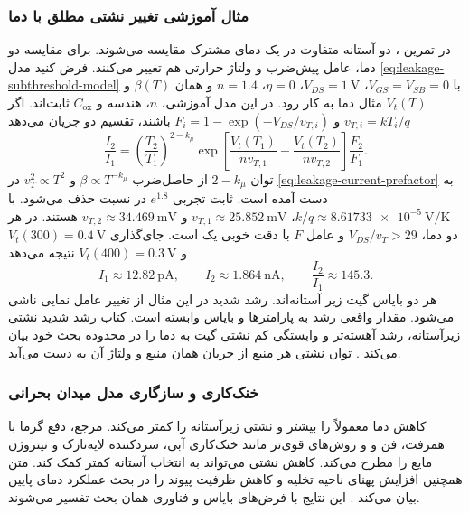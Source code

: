 \subsubsection*{مثال آموزشی تغییر نشتی مطلق با دما}
در تمرین ، دو آستانه متفاوت در یک دمای مشترک مقایسه می‌شوند.
برای مقایسه دو دما، عامل پیش‌ضرب و ولتاژ حرارتی هم تغییر می‌کنند.
فرض کنید مدل \eqref{eq:leakage-subthreshold-model} با
\(V_{GS}=V_{SB}=0\)، \(V_{DS}=\qty{1}{\volt}\)، \(\eta=0\)،
\(n=1.4\) و همان \(\beta(T)\) و \(V_t(T)\) مثال دما به کار رود.
در این مدل آموزشی، \(n\)، هندسه و \(C_{\mathrm{ox}}\) ثابت‌اند.
اگر \(v_{T,i}=kT_i/q\) و
\(F_i=1-\exp(-V_{DS}/v_{T,i})\) باشند، تقسیم دو جریان می‌دهد
\begin{equation}
 \frac{I_2}{I_1}=
 \left(\frac{T_2}{T_1}\right)^{2-k_\mu}
 \exp\!\left[\frac{V_t(T_1)}{nv_{T,1}}
             -\frac{V_t(T_2)}{nv_{T,2}}\right]\frac{F_2}{F_1}.
 \label{eq:temperature-leakage-ratio}
\end{equation}
توان \(2-k_\mu\) از حاصل‌ضرب
\(\beta\propto T^{-k_\mu}\) و \(v_T^2\propto T^2\) در
\eqref{eq:leakage-current-prefactor} به دست آمده است.
ثابت تجربی \(e^{1.8}\) در نسبت حذف می‌شود.
با \(k/q\approx\qty{8.61733e-5}{\volt\per\kelvin}\)،
\(v_{T,1}\approx\qty{25.852}{\milli\volt}\) و
\(v_{T,2}\approx\qty{34.469}{\milli\volt}\) هستند.
در هر دو دما، \(V_{DS}/v_T>29\) و عامل \(F\) با دقت خوبی یک است.
جای‌گذاری \(V_t(300)=\qty{0.4}{\volt}\) و
\(V_t(400)=\qty{0.3}{\volt}\) نتیجه می‌دهد
\begin{equation*}
 I_1\approx\qty{12.82}{\pico\ampere},\qquad
 I_2\approx\qty{1.864}{\nano\ampere},\qquad
 \frac{I_2}{I_1}\approx145.3.
\end{equation*}
هر دو بایاس گیت زیر آستانه‌اند. رشد شدید در این مثال از تغییر عامل
نمایی ناشی می‌شود. مقدار واقعی رشد به پارامترها و بایاس وابسته است.
کتاب رشد شدید نشتی زیرآستانه، رشد آهسته‌تر  و وابستگی کم
نشتی گیت به دما را در محدوده بحث خود بیان می‌کند
\cite[صفحه ۸۵]{weste}. توان نشتی هر منبع از جریان همان منبع و
ولتاژ آن به دست می‌آید.

\subsubsection*{خنک‌کاری و سازگاری مدل میدان بحرانی}
کاهش دما معمولاً  را بیشتر و نشتی زیرآستانه را کمتر
می‌کند. مرجع، دفع گرما با همرفت، فن و  و روش‌های
قوی‌تر مانند خنک‌کاری آبی، سردکننده لایه‌نازک و نیتروژن مایع را
مطرح می‌کند. کاهش نشتی می‌تواند به انتخاب آستانه کمتر کمک کند.
متن همچنین افزایش پهنای ناحیه تخلیه و کاهش ظرفیت پیوند را در بحث
عملکرد دمای پایین بیان می‌کند \cite[صفحه ۸۶]{weste}.
این نتایج با فرض‌های بایاس و فناوری همان بحث تفسیر می‌شوند.

